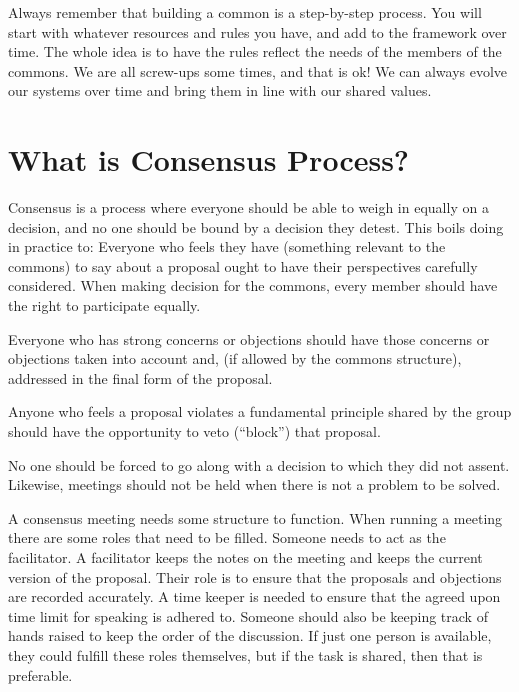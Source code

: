 \documentclass{article}
\begin{document}
\vspace{0.2cm}
Always remember that building a common is a step-by-step process. You will start with whatever resources and rules you have, and add to the framework over time. The whole idea is to have the rules reflect the needs of the members of the commons. We are all screw-ups some times, and that is ok! We can always evolve our systems over time and bring them in line with our shared values. 




\pagebreak

\section{What is Consensus Process?}

Consensus is a process where everyone should be able to weigh in equally on a decision, and no one should be bound by a decision they detest. This boils doing in practice to: Everyone who feels they have (something relevant to the commons) to say about a proposal ought to have their perspectives carefully considered. When making decision for the commons, every member should have the right to participate equally.

Everyone who has strong concerns or objections should have those concerns or objections taken into account and, (if allowed by the commons structure), addressed in the final form of the proposal.

Anyone who feels a proposal violates a fundamental principle shared by the group should have the opportunity to veto (“block”) that proposal.

No one should be forced to go along with a decision to which they did not assent. Likewise, meetings should not be held when there is not a problem to be solved. 

A consensus meeting needs some structure to function. When running a meeting there are some roles that need to be filled. Someone needs to act as the facilitator. A facilitator keeps the notes on the meeting and keeps the current version of the proposal. Their role is to ensure that the proposals and objections are recorded accurately. A time keeper is needed to ensure that the agreed upon time limit for speaking is adhered to. Someone should also be keeping track of hands raised to keep the order of the discussion. If just one person is available, they could fulfill these roles themselves, but if the task is shared, then that is preferable. 
\end{document}
